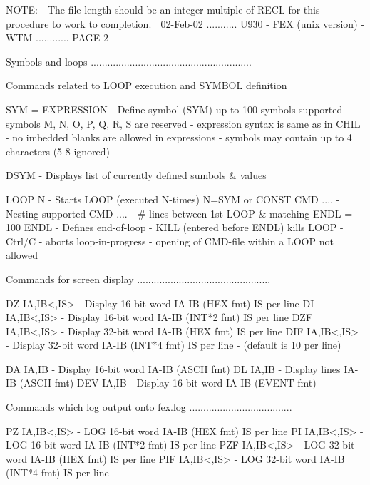    NOTE:     - The file length should be an integer multiple of RECL
               for this procedure to work to completion.
    
   02-Feb-02 ........... U930 - FEX (unix version) - WTM ............ PAGE   2
 
 
 
   Symbols and loops ..........................................................
 
   Commands related to LOOP execution and SYMBOL definition
 
   SYM = EXPRESSION - Define symbol (SYM) up to 100 symbols supported
                    - symbols M, N, O, P, Q, R, S are reserved
                    - expression syntax is same as in CHIL
                    - no imbedded blanks are allowed in expressions
                    - symbols may contain up to 4 characters (5-8 ignored)
 
   DSYM             - Displays list of currently defined sumbols & values
 
   LOOP N           - Starts LOOP (executed N-times) N=SYM or CONST
   CMD  ....        - Nesting supported
   CMD  ....        - # lines between 1st LOOP & matching ENDL = 100
   ENDL             - Defines end-of-loop
                    - KILL (entered before ENDL) kills LOOP
                    - Ctrl/C - aborts loop-in-progress
                    - opening of CMD-file within a LOOP not allowed
 
 
   Commands for screen display ................................................
 
   DZ  IA,IB<,IS> - Display 16-bit word IA-IB (HEX   fmt) IS per line
   DI  IA,IB<,IS> - Display 16-bit word IA-IB (INT*2 fmt) IS per line
   DZF IA,IB<,IS> - Display 32-bit word IA-IB (HEX   fmt) IS per line
   DIF IA,IB<,IS> - Display 32-bit word IA-IB (INT*4 fmt) IS per line
                  - (default is 10 per line)
 
   DA  IA,IB      - Display 16-bit word IA-IB (ASCII fmt)
   DL  IA,IB      - Display lines       IA-IB (ASCII fmt)
   DEV IA,IB      - Display 16-bit word IA-IB (EVENT fmt)
 
   Commands which log output onto fex.log .....................................
 
   PZ  IA,IB<,IS> - LOG     16-bit word IA-IB (HEX   fmt) IS per line
   PI  IA,IB<,IS> - LOG     16-bit word IA-IB (INT*2 fmt) IS per line
   PZF IA,IB<,IS> - LOG     32-bit word IA-IB (HEX   fmt) IS per line
   PIF IA,IB<,IS> - LOG     32-bit word IA-IB (INT*4 fmt) IS per line
 
